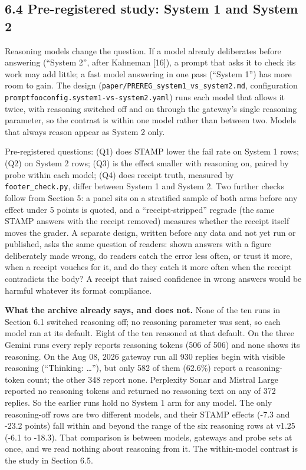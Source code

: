 \documentclass[
  11pt,
]{article}
\begin{document}
\hypertarget{pre-registered-study-system-1-and-system-2}{%
\subsection{6.4 Pre-registered study: System 1 and System
2}\label{pre-registered-study-system-1-and-system-2}}

Reasoning models change the question. If a model already deliberates
before answering (``System 2'', after Kahneman {[}16{]}), a prompt that
asks it to check its work may add little; a fast model answering in one
pass (``System 1'') has more room to gain. The design
(\texttt{paper/PREREG\_system1\_vs\_system2.md}, configuration
\texttt{promptfooconfig.system1-vs-system2.yaml}) runs each model that
allows it twice, with reasoning switched off and on through the
gateway's single reasoning parameter, so the contrast is within one
model rather than between two. Models that always reason appear as
System 2 only.

Pre-registered questions: (Q1) does STAMP lower the fail rate on System
1 rows; (Q2) on System 2 rows; (Q3) is the effect smaller with reasoning
on, paired by probe within each model; (Q4) does receipt truth, measured
by \texttt{footer\_check.py}, differ between System 1 and System 2. Two
further checks follow from Section 5: a panel sits on a stratified
sample of both arms before any effect under 5 points is quoted, and a
``receipt-stripped'' regrade (the same STAMP answers with the receipt
removed) measures whether the receipt itself moves the grader. A
separate design, written before any data and not yet run or published,
asks the same question of readers: shown answers with a figure
deliberately made wrong, do readers catch the error less often, or trust
it more, when a receipt vouches for it, and do they catch it more often
when the receipt contradicts the body? A receipt that raised confidence
in wrong answers would be harmful whatever its format compliance.

\textbf{What the archive already says, and does not.} None of the ten
runs in Section 6.1 switched reasoning off; no reasoning parameter was
sent, so each model ran at its default. Eight of the ten reasoned at
that default. On the three Gemini runs every reply reports reasoning
tokens (506 of 506) and none shows its reasoning. On the Aug 08, 2026
gateway run all 930 replies begin with visible reasoning (``Thinking:
\ldots{}''), but only 582 of them (62.6\%) report a reasoning-token
count; the other 348 report none. Perplexity Sonar and Mistral Large
reported no reasoning tokens and returned no reasoning text on any of
372 replies. So the earlier runs hold no System 1 arm for any model. The
only reasoning-off rows are two different models, and their STAMP
effects (-7.3 and -23.2 points) fall within and beyond the range of the
six reasoning rows at v1.25 (-6.1 to -18.3). That comparison is between
models, gateways and probe sets at once, and we read nothing about
reasoning from it. The within-model contrast is the study in Section
6.5.
\end{document}
